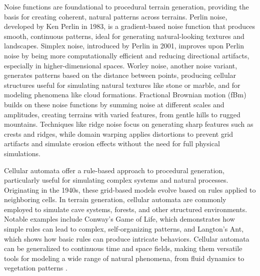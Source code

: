 Noise functions are foundational to procedural terrain generation, providing the basis for creating coherent, natural patterns across terrains. Perlin noise, developed by Ken Perlin in 1983, is a gradient-based noise function that produces smooth, continuous patterns, ideal for generating natural-looking textures and landscapes. Simplex noise, introduced by Perlin in 2001, improves upon Perlin noise by being more computationally efficient and reducing directional artifacts, especially in higher-dimensional spaces. Worley noise, another noise variant, generates patterns based on the distance between points, producing cellular structures useful for simulating natural textures like stone or marble, and for modeling phenomena like cloud formations. Fractional Brownian motion (fBm) builds on these noise functions by summing noise at different scales and amplitudes, creating terrains with varied features, from gentle hills to rugged mountains. Techniques like ridge noise focus on generating sharp features such as crests and ridges, while domain warping applies distortions to prevent grid artifacts and simulate erosion effects without the need for full physical simulations.

Cellular automata offer a rule-based approach to procedural generation, particularly useful for simulating complex systems and natural processes. Originating in the 1940s, these grid-based models evolve based on rules applied to neighboring cells. In terrain generation, cellular automata are commonly employed to simulate cave systems, forests, and other structured environments. Notable examples include Conway's Game of Life, which demonstrates how simple rules can lead to complex, self-organizing patterns, and Langton's Ant, which shows how basic rules can produce intricate behaviors. Cellular automata can be generalized to continuous time and space fields, making them versatile tools for modeling a wide range of natural phenomena, from fluid dynamics \cite{Cattaneo2005,Boldea2009,Menshutina2020} to vegetation patterns \cite{Greene1989}.

